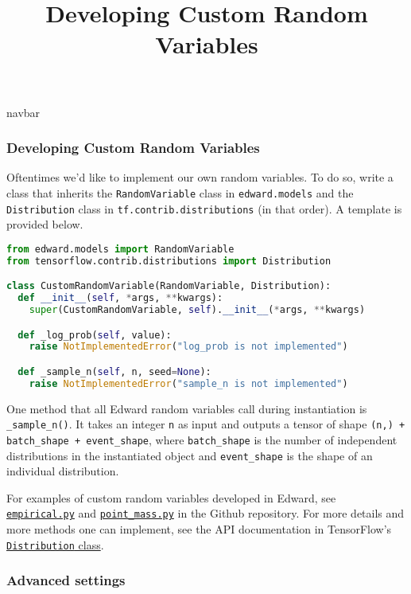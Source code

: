 \title{Developing Custom Random Variables}

{{navbar}}

\subsubsection{Developing Custom Random Variables}

Oftentimes we'd like to implement our own random variables.
To do so, write a class that inherits
the \texttt{RandomVariable} class in \texttt{edward.models} and
the \texttt{Distribution} class in \texttt{tf.contrib.distributions} (in that
order). A template is provided below.

\begin{lstlisting}[language=Python]
from edward.models import RandomVariable
from tensorflow.contrib.distributions import Distribution

class CustomRandomVariable(RandomVariable, Distribution):
  def __init__(self, *args, **kwargs):
    super(CustomRandomVariable, self).__init__(*args, **kwargs)

  def _log_prob(self, value):
    raise NotImplementedError("log_prob is not implemented")

  def _sample_n(self, n, seed=None):
    raise NotImplementedError("sample_n is not implemented")
\end{lstlisting}

One method that all Edward random variables call during instantiation is
\texttt{_sample_n()}.
It takes an integer \texttt{n} as input and outputs a tensor of shape
\texttt{(n,) + batch_shape + event_shape}, where \texttt{batch_shape}
is the number of independent distributions in the instantiated object
and \texttt{event_shape} is the shape of an individual distribution.

For examples of custom random variables developed in Edward, see
\href{https://github.com/blei-lab/edward/blob/master/edward/models/empirical.py}{\texttt{empirical.py}}
and
\href{https://github.com/blei-lab/edward/blob/master/edward/models/point_mass.py}{\texttt{point_mass.py}}
in the Github repository.
For more details and more methods one can implement, see the API
documentation in TensorFlow's
\href{https://www.tensorflow.org/versions/master/api_docs/python/contrib.distributions/base_classes#Distribution}{\texttt{Distribution} class}.

\subsubsection{Advanced settings}

